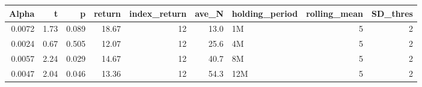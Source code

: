 \begin{table}[ht]
\centering
\begin{tabular}{rrrrrrlrr}
  \hline
Alpha & t & p & return & index\_return & ave\_N & holding\_period & rolling\_mean & SD\_thres \\ 
  \hline
0.0072 & 1.73 & 0.089 & 18.67 & 12 & 13.0 & 1M &  5 &  2 \\ 
  0.0024 & 0.67 & 0.505 & 12.07 & 12 & 25.6 & 4M &  5 &  2 \\ 
  0.0057 & 2.24 & 0.029 & 14.67 & 12 & 40.7 & 8M &  5 &  2 \\ 
  0.0047 & 2.04 & 0.046 & 13.36 & 12 & 54.3 & 12M &  5 &  2 \\ 
   \hline
\end{tabular}
\end{table}

